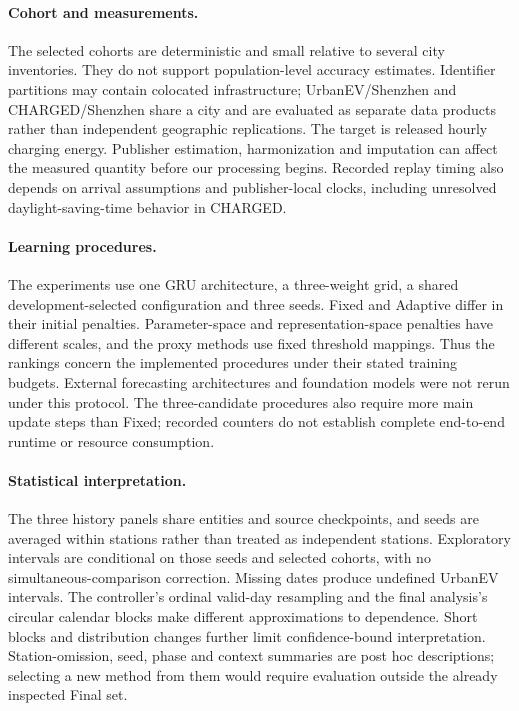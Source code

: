 \documentclass[pdflatex,iicol,sn-mathphys-num]{sn-jnl}
\begin{document}
\paragraph{Cohort and measurements.}
The selected cohorts are deterministic and small relative to several city inventories. They do not support population-level accuracy estimates. Identifier partitions may contain colocated infrastructure; UrbanEV/Shenzhen and CHARGED/Shenzhen share a city and are evaluated as separate data products rather than independent geographic replications. The target is released hourly charging energy. Publisher estimation, harmonization and imputation can affect the measured quantity before our processing begins. Recorded replay timing also depends on arrival assumptions and publisher-local clocks, including unresolved daylight-saving-time behavior in CHARGED.

\paragraph{Learning procedures.}
The experiments use one GRU architecture, a three-weight grid, a shared development-selected configuration and three seeds. Fixed and Adaptive differ in their initial penalties. Parameter-space and representation-space penalties have different scales, and the proxy methods use fixed threshold mappings. Thus the rankings concern the implemented procedures under their stated training budgets. External forecasting architectures and foundation models were not rerun under this protocol. The three-candidate procedures also require more main update steps than Fixed; recorded counters do not establish complete end-to-end runtime or resource consumption.

\paragraph{Statistical interpretation.}
The three history panels share entities and source checkpoints, and seeds are averaged within stations rather than treated as independent stations. Exploratory intervals are conditional on those seeds and selected cohorts, with no simultaneous-comparison correction. Missing dates produce undefined UrbanEV intervals. The controller's ordinal valid-day resampling and the final analysis's circular calendar blocks make different approximations to dependence. Short blocks and distribution changes further limit confidence-bound interpretation. Station-omission, seed, phase and context summaries are post hoc descriptions; selecting a new method from them would require evaluation outside the already inspected Final set.
\end{document}
